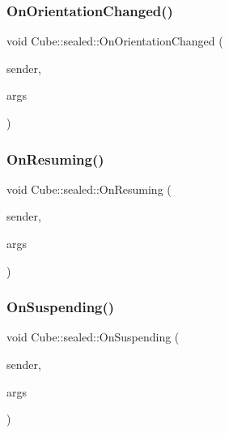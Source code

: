 \mbox{\label{class_cube_1_1sealed_a6c53f2260bcb4d51d1e4c21df620dbe0}} 
\subsubsection{\texorpdfstring{On\+Orientation\+Changed()}{OnOrientationChanged()}}
{\footnotesize\ttfamily void Cube\+::sealed\+::\+On\+Orientation\+Changed (\begin{DoxyParamCaption}\item[{Windows\+::\+Graphics\+::\+Display\+::\+Display\+Information$^\wedge$}]{sender,  }\item[{Platform\+::\+Object$^\wedge$}]{args }\end{DoxyParamCaption})\hspace{0.3cm}{\ttfamily [protected]}}

\mbox{\label{class_cube_1_1sealed_a131584644dbd091d751a242b7a234922}} 
\subsubsection{\texorpdfstring{On\+Resuming()}{OnResuming()}}
{\footnotesize\ttfamily void Cube\+::sealed\+::\+On\+Resuming (\begin{DoxyParamCaption}\item[{Platform\+::\+Object$^\wedge$}]{sender,  }\item[{Platform\+::\+Object$^\wedge$}]{args }\end{DoxyParamCaption})\hspace{0.3cm}{\ttfamily [protected]}}

\mbox{\label{class_cube_1_1sealed_a45dbe3797567e448ec7b26db0f30ea56}} 
\subsubsection{\texorpdfstring{On\+Suspending()}{OnSuspending()}}
{\footnotesize\ttfamily void Cube\+::sealed\+::\+On\+Suspending (\begin{DoxyParamCaption}\item[{Platform\+::\+Object$^\wedge$}]{sender,  }\item[{Windows\+::\+Application\+Model\+::\+Suspending\+Event\+Args$^\wedge$}]{args }\end{DoxyParamCaption})\hspace{0.3cm}{\ttfamily [protected]}}


